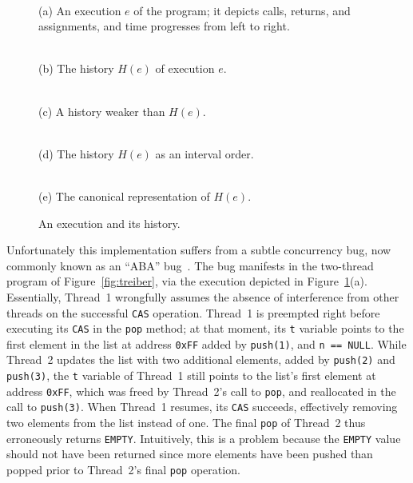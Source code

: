 \begin{figure}[t]
  \footnotesize
  \centering
   \\
  \smallskip
  \parbox{0.8\linewidth}{(a) An execution $e$ of the program; it depicts calls,
  returns, and assignments, and time progresses from left to right.}

  \bigskip
  \begin{minipage}{43mm}
     \\
    (b) The history $H(e)$ of execution $e$.
  \end{minipage}
  \begin{minipage}{40mm}
     \\
    (c) A history weaker than $H(e)$.
  \end{minipage}

  \bigskip
   \\
  (d) The history $H(e)$ as an interval order.

  \bigskip
   \\
  (e) The canonical representation of $H(e)$.

  \caption{An execution and its history.}
  \label{fig:stacks}
\end{figure}

Unfortunately this implementation suffers from a subtle concurrency bug, now
commonly known as an ``ABA'' bug~\cite{tr/ibm/Michael04}. The bug manifests in
the two-thread program of Figure~\ref{fig:treiber}, via the execution depicted
in Figure~\ref{fig:stacks}(a). Essentially, Thread~1 wrongfully assumes the
absence of interference from other threads on the successful {\tt CAS}
operation. Thread~1 is preempted right before executing its {\tt CAS} in the
{\tt pop} method; at that moment, its {\tt t} variable points to the first
element in the list at address {\tt 0xFF} added by {\tt push(1)}, and {\tt n ==
NULL}. While Thread~2 updates the list with two additional elements, added by
{\tt push(2)} and {\tt push(3)}, the {\tt t} variable of Thread~1 still points
to the list's first element at address {\tt 0xFF}, which was freed by
Thread~2's call to {\tt pop}, and reallocated in the call to {\tt push(3)}.
When Thread~1 resumes, its {\tt CAS} succeeds, effectively removing two
elements from the list instead of one. The final {\tt pop} of Thread~2 thus
erroneously returns {\tt EMPTY}. Intuitively, this is a problem because the
{\tt EMPTY} value should not have been returned since more elements have been
pushed than popped prior to Thread~2's final {\tt pop} operation.

